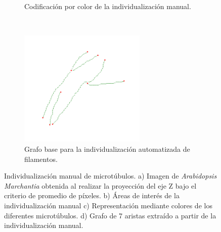 \begin{figure}[h!]
\begin{subfigure}[t]{0.49\textwidth}
        \caption{Codificaci\'on por color de la individualizaci\'on manual.}
        \label{fig:field3t0filtered2-indivManual}
    \end{subfigure}
    ~
    \begin{subfigure}[t]{0.49\textwidth}
        \centering
        \includegraphics[height=2.2in]{benchImages/field3-t0-2cellBcrop-filtered-2-graph-thick.png}
        \caption{Grafo base para la individualizaci\'on automatizada de filamentos.}
        \label{fig:field3t0filtered2-graph}
    \end{subfigure}
    \caption{Individualizaci\'on manual de microt\'ubulos. a) Imagen de {\it Arabidopsis Marchantia} obtenida al realizar la proyecci\'on del eje Z bajo el criterio de promedio de p\'ixeles. b) \'Areas de inter\'es de la individualizaci\'on manual c) Representaci\'on mediante colores de los diferentes microt\'ubulos. d) Grafo de 7 aristas extra\'ido a partir de la individualizaci\'on manual.}
    \label{fig:field3t0filtered2}
\end{figure}

